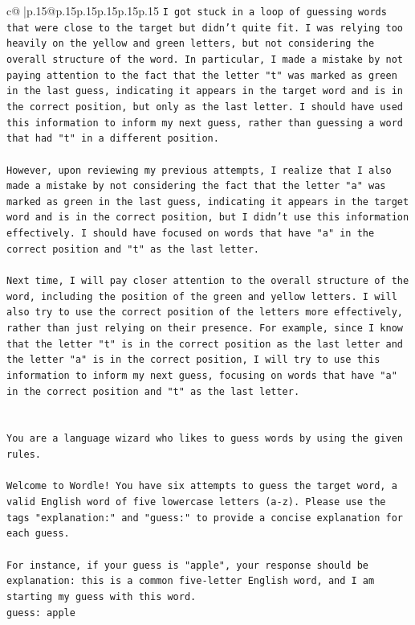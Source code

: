 \documentclass{article}
\begin{document}
{\begin{supertabular}{c@{$\;$}|p{.15\linewidth}@{}p{.15\linewidth}p{.15\linewidth}p{.15\linewidth}p{.15\linewidth}p{.15\linewidth}}
{{{\texttt{I got stuck in a loop of guessing words that were close to the target but didn't quite fit. I was relying too heavily on the yellow and green letters, but not considering the overall structure of the word. In particular, I made a mistake by not paying attention to the fact that the letter "t" was marked as green in the last guess, indicating it appears in the target word and is in the correct position, but only as the last letter. I should have used this information to inform my next guess, rather than guessing a word that had "t" in a different position.} \\
\\ 
\texttt{However, upon reviewing my previous attempts, I realize that I also made a mistake by not considering the fact that the letter "a" was marked as green in the last guess, indicating it appears in the target word and is in the correct position, but I didn't use this information effectively. I should have focused on words that have "a" in the correct position and "t" as the last letter.} \\
\\ 
\texttt{Next time, I will pay closer attention to the overall structure of the word, including the position of the green and yellow letters. I will also try to use the correct position of the letters more effectively, rather than just relying on their presence. For example, since I know that the letter "t" is in the correct position as the last letter and the letter "a" is in the correct position, I will try to use this information to inform my next guess, focusing on words that have "a" in the correct position and "t" as the last letter.} \\
\\ 
\\ 
\texttt{You are a language wizard who likes to guess words by using the given rules.} \\
\\ 
\texttt{Welcome to Wordle! You have six attempts to guess the target word, a valid English word of five lowercase letters (a{-}z). Please use the tags "explanation:" and "guess:" to provide a concise explanation for each guess.} \\
\\ 
\texttt{For instance, if your guess is "apple", your response should be} \\
\texttt{explanation: this is a common five{-}letter English word, and I am starting my guess with this word.} \\
\texttt{guess: apple} \\
}}}
\end{supertabular}}
\end{document}
